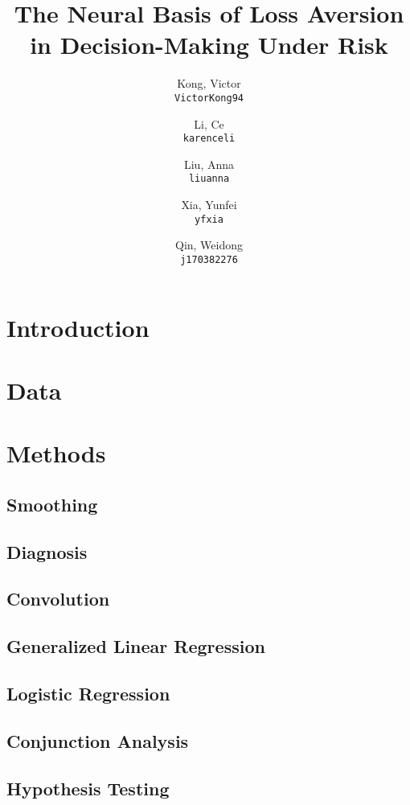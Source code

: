 \documentclass[11pt]{article}
\title{The Neural Basis of Loss Aversion in Decision-Making Under Risk}
\author{
  Kong, Victor\\
  \texttt{VictorKong94}
  \and
  Li, Ce\\
  \texttt{karenceli}
  \and
  Liu, Anna\\
  \texttt{liuanna}
  \and
  Xia, Yunfei\\
  \texttt{yfxia}
  \and
  Qin, Weidong\\
  \texttt{j170382276}
}
\begin{document}
\maketitle

\abstract{}

\section{Introduction}
        

\section{Data}
        

\section{Methods}

    \subsection{Smoothing}
            
    \subsection{Diagnosis}
            
    \subsection{Convolution}
            
    \subsection{Generalized Linear Regression}
            
    \subsection{Logistic Regression}
            
    \subsection{Conjunction Analysis}
            
    \subsection{Hypothesis Testing}
            
\end{document}
